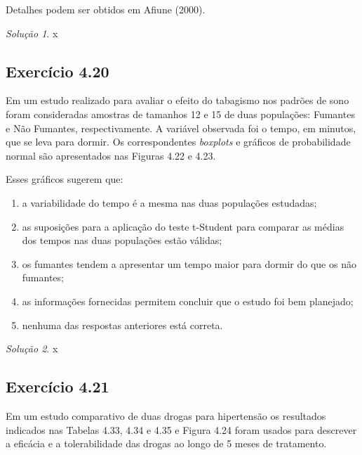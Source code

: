 \documentclass[
]{latex/krantz}
\providecommand{\tightlist}{%
  \setlength{\itemsep}{0pt}\setlength{\parskip}{0pt}}
\theoremstyle{definition}
\theoremstyle{definition}
\theoremstyle{definition}
\theoremstyle{definition}
\theoremstyle{remark}
\newtheorem*{solution}{Solução}
\begin{document}
Detalhes podem ser obtidos em Afiune (2000).

\begin{solution}
x
\end{solution}

\hypertarget{exr4-20}{%
\subsection*{Exercício 4.20}\label{exr4-20}}

Em um estudo realizado para avaliar o efeito do tabagismo nos padrões de sono foram consideradas amostras de tamanhos 12 e 15 de duas populações: Fumantes e Não Fumantes, respectivamente. A variável observada foi o tempo, em minutos, que se leva para dormir. Os correspondentes \emph{boxplots} e gráficos de probabilidade normal são apresentados nas Figuras 4.22 e 4.23.

Esses gráficos sugerem que:

\begin{enumerate}
\def\labelenumi{\alph{enumi}.}
\tightlist
\item
  a variabilidade do tempo é a mesma nas duas populações estudadas;
\item
  as suposições para a aplicação do teste t-Student para comparar as médias dos tempos nas duas populações estão válidas;
\item
  os fumantes tendem a apresentar um tempo maior para dormir do que os não fumantes;
\item
  as informações fornecidas permitem concluir que o estudo foi bem planejado;
\item
  nenhuma das respostas anteriores está correta.
\end{enumerate}

\begin{solution}
x
\end{solution}

\hypertarget{exr4-21}{%
\subsection*{Exercício 4.21}\label{exr4-21}}

Em um estudo comparativo de duas drogas para hipertensão os resultados indicados nas Tabelas 4.33, 4.34 e 4.35 e Figura 4.24 foram usados para descrever a eficácia e a tolerabilidade das drogas ao longo de 5 meses de tratamento.
\end{document}
